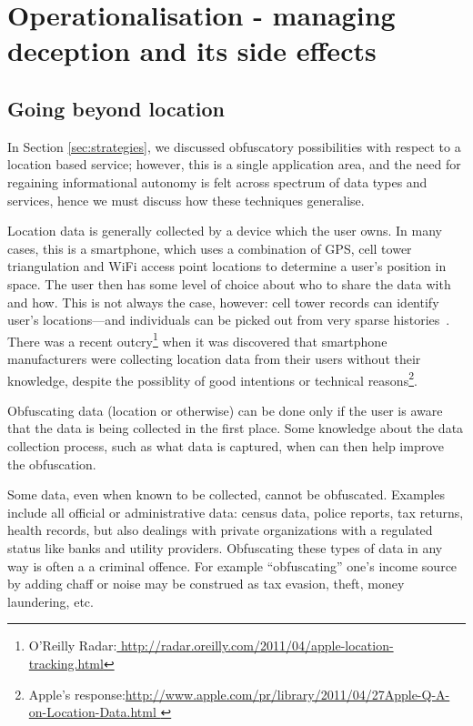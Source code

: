 \documentclass{IOS-Book-Article}     %
\newcommand{\tbox}[3][red]{{
\color{#1}\noindent{
   \fbox{\scriptsize{ {\bf #2} \textsl{#3}}}
   \vspace{2pt}
}
}}
\newcommand{\todo}[1]{\tbox{TODO:}{#1}}
\begin{document}
\section{Operationalisation - managing deception and its side effects}

\subsection{Going beyond location}

In Section \ref{sec:strategies}, we discussed obfuscatory possibilities with
respect to a location based service; however, this is a single application area,
and the need for regaining informational autonomy is felt across spectrum of
data types and services, hence we must discuss how these techniques generalise.

Location data is generally collected by a device which the user owns. In many
cases, this is a smartphone, which uses a combination of GPS, cell tower
triangulation and WiFi access point locations to determine a user's position in
space. The user then has some level of choice about who to share the data with
and how. This is not always the case, however: cell tower records can identify
user's locations---and individuals can be picked out from very sparse
histories~\cite{montjoye2013Unique}. There was a recent 
outcry\footnote{O'Reilly Radar:\url{
http://radar.oreilly.com/2011/04/apple-location-tracking.html}} when it was
discovered that smartphone manufacturers were collecting location data from
their users without their knowledge, despite the possiblity of good intentions
or technical reasons\footnote{Apple's
response:\url{http://www.apple.com/pr/library/2011/04/27Apple-Q-A-on-Location-Data.html }}.

Obfuscating data (location or otherwise) can be done only if the user is
aware that the data is being collected in the first place. Some knowledge
about the data collection process, such as what data is captured, when can
then help improve the obfuscation.

Some data, even when known to be collected, cannot be obfuscated. Examples 
include all official or administrative data: census data, police reports,
tax returns, health records, but also dealings with private organizations with a
regulated status like banks and utility providers. 
Obfuscating these types of data in any way is often a a criminal offence. 
For example ``obfuscating'' one's income source by adding chaff or noise may be
construed as tax evasion, theft, money laundering, etc.
\end{document}
